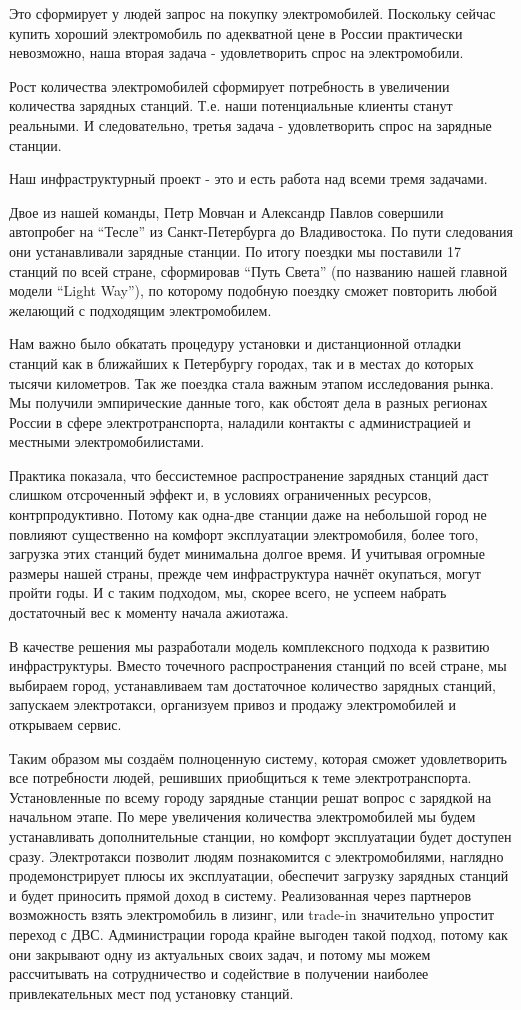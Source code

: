 \documentclass[a4paper,12pt]{report}
\begin{document}
Это сформирует у людей запрос на покупку электромобилей. Поскольку сейчас купить хороший электромобиль по адекватной цене в России практически невозможно, наша вторая задача - удовлетворить спрос на электромобили. 

Рост количества электромобилей сформирует потребность в увеличении количества зарядных станций. Т.е. наши потенциальные клиенты станут реальными. И следовательно, третья задача - удовлетворить спрос на зарядные станции.

Наш инфраструктурный проект - это и есть работа над всеми тремя задачами. 

Двое из нашей команды, Петр Мовчан и Александр Павлов совершили автопробег на “Тесле” из Санкт-Петербурга до Владивостока. По пути следования они устанавливали зарядные станции. По итогу поездки мы поставили 17 станций по всей стране, сформировав “Путь Света” (по названию нашей главной модели “Light Way”), по которому подобную поездку сможет повторить любой желающий с подходящим электромобилем. 

Нам важно было обкатать процедуру установки и дистанционной отладки станций как в ближайших к Петербургу городах, так и в местах до которых тысячи километров. Так же поездка стала важным этапом исследования рынка. Мы получили эмпирические данные того, как обстоят дела в разных регионах России в сфере электротранспорта, наладили контакты с администрацией и местными электромобилистами. 

Практика показала, что бессистемное распространение зарядных станций даст слишком отсроченный эффект и, в условиях ограниченных ресурсов, контрпродуктивно. Потому как одна-две станции даже на небольшой город не повлияют существенно на комфорт эксплуатации электромобиля, более того, загрузка этих станций будет минимальна долгое время. И учитывая огромные размеры нашей страны, прежде чем инфраструктура начнёт окупаться, могут пройти годы. И с таким подходом, мы, скорее всего, не успеем набрать достаточный вес к моменту начала ажиотажа. 

В качестве решения мы разработали модель комплексного подхода к развитию инфраструктуры. Вместо точечного распространения станций по всей стране, мы выбираем город, устанавливаем там достаточное количество зарядных станций, запускаем электротакси, организуем привоз и продажу электромобилей и открываем сервис. 

Таким образом мы создаём полноценную систему, которая сможет удовлетворить все потребности людей, решивших приобщиться к теме электротранспорта. Установленные по всему городу зарядные станции решат вопрос с зарядкой на начальном этапе. По мере увеличения количества электромобилей мы будем устанавливать дополнительные станции, но комфорт эксплуатации будет доступен сразу. Электротакси позволит людям познакомится с электромобилями, наглядно продемонстрирует плюсы их эксплуатации, обеспечит загрузку зарядных станций и будет приносить прямой доход в систему. Реализованная через партнеров возможность взять электромобиль в лизинг, или trade-in значительно упростит переход с ДВС. Администрации города крайне выгоден такой подход, потому как они закрывают одну из актуальных своих задач, и потому мы можем рассчитывать на сотрудничество и содействие в получении наиболее привлекательных мест под установку станций. 
\end{document}
